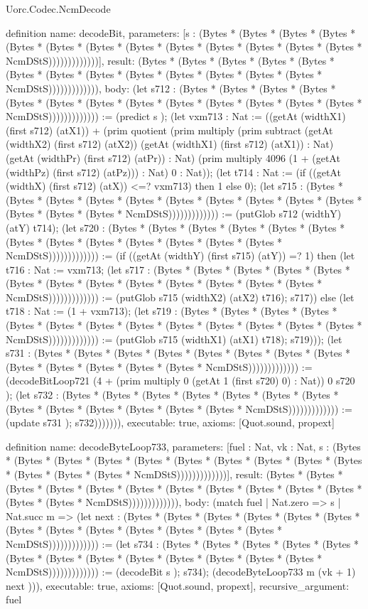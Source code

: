 \begin{lexlean}{Uorc.Codec.NcmDecode}
\begin{semanticmodule}
definition{
  name: decodeBit,
  parameters: [s : (Bytes * (Bytes * (Bytes * (Bytes * (Bytes * (Bytes * (Bytes * (Bytes * (Bytes * (Bytes * (Bytes * (Bytes * (Bytes * NcmDStS)))))))))))))],
  result: (Bytes * (Bytes * (Bytes * (Bytes * (Bytes * (Bytes * (Bytes * (Bytes * (Bytes * (Bytes * (Bytes * (Bytes * (Bytes * NcmDStS))))))))))))),
  body: (let s712 : (Bytes * (Bytes * (Bytes * (Bytes * (Bytes * (Bytes * (Bytes * (Bytes * (Bytes * (Bytes * (Bytes * (Bytes * (Bytes * NcmDStS))))))))))))) := (predict s ); (let vxm713 : Nat := ((getAt (widthX1) (first s712) (atX1)) + (prim quotient (prim multiply (prim subtract (getAt (widthX2) (first s712) (atX2)) (getAt (widthX1) (first s712) (atX1)) : Nat) (getAt (widthPr) (first s712) (atPr)) : Nat) (prim multiply 4096 (1 + (getAt (widthPz) (first s712) (atPz))) : Nat) 0 : Nat)); (let t714 : Nat := (if ((getAt (widthX) (first s712) (atX)) <=? vxm713) then 1 else 0); (let s715 : (Bytes * (Bytes * (Bytes * (Bytes * (Bytes * (Bytes * (Bytes * (Bytes * (Bytes * (Bytes * (Bytes * (Bytes * (Bytes * NcmDStS))))))))))))) := (putGlob s712 (widthY) (atY) t714); (let s720 : (Bytes * (Bytes * (Bytes * (Bytes * (Bytes * (Bytes * (Bytes * (Bytes * (Bytes * (Bytes * (Bytes * (Bytes * (Bytes * NcmDStS))))))))))))) := (if ((getAt (widthY) (first s715) (atY)) =? 1) then (let t716 : Nat := vxm713; (let s717 : (Bytes * (Bytes * (Bytes * (Bytes * (Bytes * (Bytes * (Bytes * (Bytes * (Bytes * (Bytes * (Bytes * (Bytes * (Bytes * NcmDStS))))))))))))) := (putGlob s715 (widthX2) (atX2) t716); s717)) else (let t718 : Nat := (1 + vxm713); (let s719 : (Bytes * (Bytes * (Bytes * (Bytes * (Bytes * (Bytes * (Bytes * (Bytes * (Bytes * (Bytes * (Bytes * (Bytes * (Bytes * NcmDStS))))))))))))) := (putGlob s715 (widthX1) (atX1) t718); s719))); (let s731 : (Bytes * (Bytes * (Bytes * (Bytes * (Bytes * (Bytes * (Bytes * (Bytes * (Bytes * (Bytes * (Bytes * (Bytes * (Bytes * NcmDStS))))))))))))) := (decodeBitLoop721 (4 + (prim multiply 0 (getAt 1 (first s720) 0) : Nat)) 0 s720 ); (let s732 : (Bytes * (Bytes * (Bytes * (Bytes * (Bytes * (Bytes * (Bytes * (Bytes * (Bytes * (Bytes * (Bytes * (Bytes * (Bytes * NcmDStS))))))))))))) := (update s731 ); s732))))))),
  executable: true,
  axioms: [Quot.sound, propext]
}

definition{
  name: decodeByteLoop733,
  parameters: [fuel : Nat, vk : Nat, s : (Bytes * (Bytes * (Bytes * (Bytes * (Bytes * (Bytes * (Bytes * (Bytes * (Bytes * (Bytes * (Bytes * (Bytes * (Bytes * NcmDStS)))))))))))))],
  result: (Bytes * (Bytes * (Bytes * (Bytes * (Bytes * (Bytes * (Bytes * (Bytes * (Bytes * (Bytes * (Bytes * (Bytes * (Bytes * NcmDStS))))))))))))),
  body: (match fuel
    | Nat.zero => s
    | Nat.succ m => (let next : (Bytes * (Bytes * (Bytes * (Bytes * (Bytes * (Bytes * (Bytes * (Bytes * (Bytes * (Bytes * (Bytes * (Bytes * (Bytes * NcmDStS))))))))))))) := (let s734 : (Bytes * (Bytes * (Bytes * (Bytes * (Bytes * (Bytes * (Bytes * (Bytes * (Bytes * (Bytes * (Bytes * (Bytes * (Bytes * NcmDStS))))))))))))) := (decodeBit s ); s734); (decodeByteLoop733 m (vk + 1) next ))),
  executable: true,
  axioms: [Quot.sound, propext],
  recursive_argument: fuel
}


\end{semanticmodule}
\end{lexlean}

